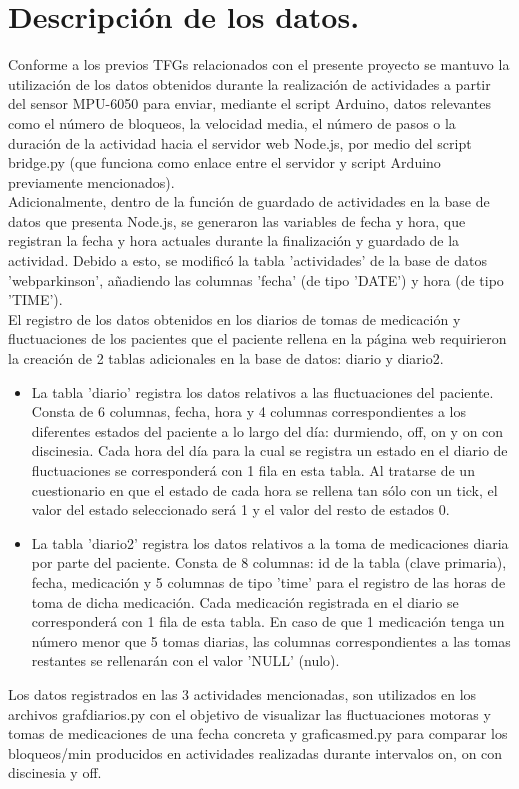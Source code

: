 
\section{Descripción de los datos.}
Conforme a los previos TFGs relacionados con el presente proyecto \cite{Gonzalez2023} \cite{Martos2024} se  mantuvo la utilización de los datos obtenidos durante la realización de actividades a partir del sensor MPU-6050 para enviar, mediante el script Arduino, datos relevantes como el número de bloqueos, la velocidad media, el número de pasos o la duración de la actividad hacia el servidor web Node.js, por medio del script bridge.py (que funciona como enlace entre el servidor y script Arduino previamente mencionados). \\

Adicionalmente, dentro de la función de guardado de actividades en la base de datos que presenta Node.js, se generaron las variables de fecha y hora, que registran la fecha y hora actuales durante la finalización y guardado de la actividad. Debido a esto, se modificó la tabla 'actividades' de la base de datos 'webparkinson', añadiendo las columnas 'fecha' (de tipo 'DATE') y hora (de tipo 'TIME').\\

El registro de los datos obtenidos en los diarios de tomas de medicación y fluctuaciones de los pacientes que el paciente rellena en la página web requirieron la creación de 2 tablas adicionales en la base de datos: diario y diario2.
\begin{itemize}
    \item La tabla 'diario' registra los datos relativos a las fluctuaciones del paciente. Consta de 6 columnas, fecha, hora y 4 columnas correspondientes a los diferentes estados del paciente a lo largo del día: durmiendo, off, on y on con discinesia. Cada hora del día para la cual se registra un estado en el diario de fluctuaciones se corresponderá con 1 fila en esta tabla. Al tratarse de un cuestionario en que el estado de cada hora se rellena tan sólo con un tick, el valor del estado seleccionado será 1 y el valor del resto de estados 0.
    \item La tabla 'diario2' registra los datos relativos a la toma de medicaciones diaria por parte del paciente. Consta de 8 columnas: id de la tabla (clave primaria), fecha, medicación y 5 columnas de tipo 'time' para el registro de las horas de toma de dicha medicación. Cada medicación registrada en el diario se corresponderá con 1 fila de esta tabla. En caso de que 1 medicación tenga un número menor que 5 tomas diarias, las columnas correspondientes a las tomas restantes se rellenarán con el valor 'NULL' (nulo).
\end{itemize}
Los datos registrados en las 3 actividades mencionadas, son utilizados en los archivos grafdiarios.py con el objetivo de visualizar las fluctuaciones motoras y tomas de medicaciones de una fecha concreta y graficasmed.py para comparar los bloqueos/min producidos en actividades realizadas durante intervalos on, on con discinesia y off.\\

